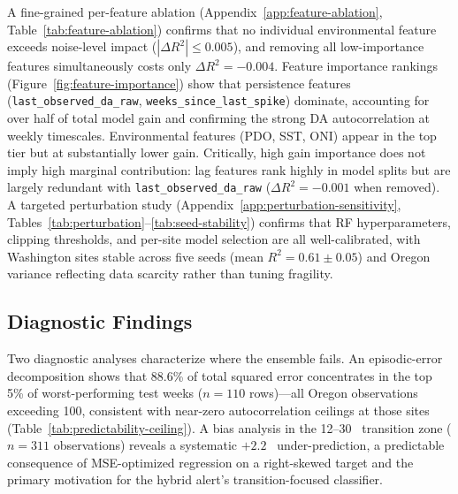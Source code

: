\documentclass[toxins,article,submit,moreauthors]{Definitions/mdpi}
\begin{document}
\begin{sloppypar}
A fine-grained per-feature ablation (Appendix~\ref{app:feature-ablation}, Table~\ref{tab:feature-ablation}) confirms that no individual environmental feature exceeds noise-level impact ($|\Delta R^2| \leq 0.005$), and removing all low-importance features simultaneously costs only $\Delta R^2 = -0.004$. Feature importance rankings (Figure~\ref{fig:feature-importance}) show that persistence features (\texttt{last\_observed\_da\_raw}, \texttt{weeks\_since\_last\_spike}) dominate, accounting for over half of total model gain and confirming the strong DA autocorrelation at weekly timescales. Environmental features (PDO, SST, ONI) appear in the top tier but at substantially lower gain. Critically, high gain importance does not imply high marginal contribution: lag features rank highly in model splits but are largely redundant with \texttt{last\_observed\_da\_raw} ($\Delta R^2 = -0.001$ when removed). A targeted perturbation study (Appendix~\ref{app:perturbation-sensitivity}, Tables~\ref{tab:perturbation}--\ref{tab:seed-stability}) confirms that RF hyperparameters, clipping thresholds, and per-site model selection are all well-calibrated, with Washington sites stable across five seeds (mean $R^2 = 0.61 \pm 0.05$) and Oregon variance reflecting data scarcity rather than tuning fragility.
\end{sloppypar}


\subsection{Diagnostic Findings}
\label{sec:results-diagnostics}

Two diagnostic analyses characterize where the ensemble fails. An episodic-error decomposition shows that 88.6\% of total squared error concentrates in the top 5\% of worst-performing test weeks ($n = 110$ rows)---all Oregon observations exceeding \SI{100}{\microgrampeg}, consistent with near-zero autocorrelation ceilings at those sites (Table~\ref{tab:predictability-ceiling}). A bias analysis in the 12--30~\si{\microgrampeg} transition zone ($n = 311$ observations) reveals a systematic $+2.2$~\si{\microgrampeg} under-prediction, a predictable consequence of MSE-optimized regression on a right-skewed target and the primary motivation for the hybrid alert's transition-focused classifier.

\end{document}
